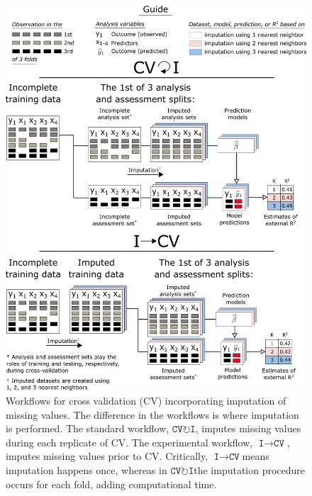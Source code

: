 \documentclass[AMA,STIX1COL,doublespace]{WileyNJD-v2}
\begin{document}
\begin{figure}
\centering
\includegraphics[width=0.85\linewidth]{figs/workflow_cv_bothways} 
\caption{Workflows for cross validation (CV) incorporating imputation of missing values. The difference in the workflows is where imputation is performed. The standard workflow, $\texttt{CV}\!\circlearrowright\!\texttt{I}$, imputes missing values during each replicate of CV. The experimental workflow, $\texttt{I}\!\!\rightarrow\!\texttt{CV}$, imputes missing values prior to CV. Critically, $\texttt{I}\!\!\rightarrow\!\texttt{CV}$\space means imputation happens once, whereas in $\texttt{CV}\!\circlearrowright\!\texttt{I}$\space the imputation procedure occurs for each fold, adding computational time.}
\label{fig:workflow_cv_bothways}
\end{figure}

\FloatBarrier
\end{document}
